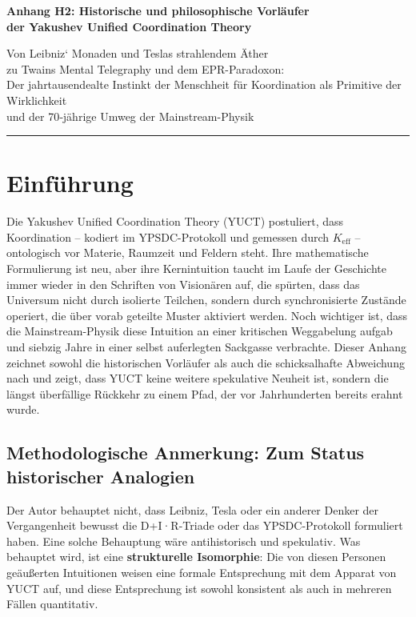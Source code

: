 \documentclass[12pt,a4paper]{article}
\def\goldline{\noindent\textcolor{gold}{\rule{\textwidth}{1.6pt}}}
\begin{document}
	\makeheader
	\thispagestyle{fancyfirst}
	\vspace*{1cm}
	
	\begin{center}
		{\fontsize{28}{32}\selectfont\bfseries\color{darkblue} Anhang H2: Historische und philosophische Vorläufer\\
			der Yakushev Unified Coordination Theory}
		
		\vspace{1cm}
		\large
		Von Leibniz‘ Monaden und Teslas strahlendem Äther\\
		zu Twains Mental Telegraphy und dem EPR-Paradoxon:\\
		Der jahrtausendealte Instinkt der Menschheit für Koordination als Primitive der Wirklichkeit\\
		und der 70‑jährige Umweg der Mainstream-Physik
	\end{center}
	
	\vspace{1.5cm}
	\goldline
	
	\section{Einführung}
	
	Die Yakushev Unified Coordination Theory (YUCT) postuliert, dass Koordination – kodiert im YPSDC-Protokoll und gemessen durch \(K_{\mathrm{eff}}\) – ontologisch vor Materie, Raumzeit und Feldern steht. Ihre mathematische Formulierung ist neu, aber ihre Kernintuition taucht im Laufe der Geschichte immer wieder in den Schriften von Visionären auf, die spürten, dass das Universum nicht durch isolierte Teilchen, sondern durch synchronisierte Zustände operiert, die über vorab geteilte Muster aktiviert werden. Noch wichtiger ist, dass die Mainstream-Physik diese Intuition an einer kritischen Weggabelung aufgab und siebzig Jahre in einer selbst auferlegten Sackgasse verbrachte. Dieser Anhang zeichnet sowohl die historischen Vorläufer als auch die schicksalhafte Abweichung nach und zeigt, dass YUCT keine weitere spekulative Neuheit ist, sondern die längst überfällige Rückkehr zu einem Pfad, der vor Jahrhunderten bereits erahnt wurde.
	
	\subsection{Methodologische Anmerkung: Zum Status historischer Analogien}
	\label{subsec:methodological-note}
	
	Der Autor behauptet nicht, dass Leibniz, Tesla oder ein anderer Denker der Vergangenheit bewusst die D+I·R-Triade oder das YPSDC-Protokoll formuliert haben. Eine solche Behauptung wäre antihistorisch und spekulativ. Was behauptet wird, ist eine \textbf{strukturelle Isomorphie}: Die von diesen Personen geäußerten Intuitionen weisen eine formale Entsprechung mit dem Apparat von YUCT auf, und diese Entsprechung ist sowohl konsistent als auch in mehreren Fällen quantitativ.
	
\end{document}
